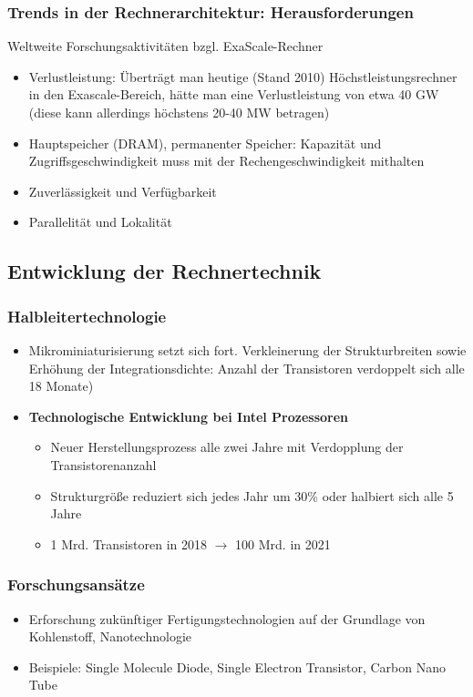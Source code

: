 \subsubsection{Trends in der Rechnerarchitektur: Herausforderungen}
Weltweite Forschungsaktivitäten bzgl. ExaScale-Rechner
\begin{itemize}
	\item Verlustleistung: Überträgt man heutige (Stand 2010) Höchstleistungsrechner in den Exascale-Bereich, hätte man eine Verlustleistung von etwa 40 GW (diese kann allerdings höchstens 20-40 MW betragen)
	\item Hauptspeicher (DRAM), permanenter Speicher: Kapazität und Zugriffsgeschwindigkeit muss mit der Rechengeschwindigkeit mithalten
	\item Zuverlässigkeit und Verfügbarkeit
	\item Parallelität und Lokalität
\end{itemize}


\subsection{Entwicklung der Rechnertechnik}

\subsubsection{Halbleitertechnologie}
\begin{itemize}
	\item Mikrominiaturisierung setzt sich fort. Verkleinerung der Strukturbreiten sowie Erhöhung der Integrationsdichte: Anzahl der Transistoren verdoppelt sich alle 18 Monate)
	\item \textbf{Technologische Entwicklung bei Intel Prozessoren}
	\begin{itemize}
		\item Neuer Herstellungsprozess alle zwei Jahre mit Verdopplung der Transistorenanzahl
		\item Strukturgröße reduziert sich jedes Jahr um 30\% oder halbiert sich alle 5 Jahre
		\item 1 Mrd. Transistoren in 2018 \(\rightarrow\) 100 Mrd. in 2021
	\end{itemize}
\end{itemize}

\subsubsection{Forschungsansätze}
\begin{itemize}
	\item Erforschung zukünftiger Fertigungstechnologien auf der Grundlage von Kohlenstoff, Nanotechnologie
	\item Beispiele: Single Molecule Diode, Single Electron Transistor, Carbon Nano Tube
\end{itemize}


